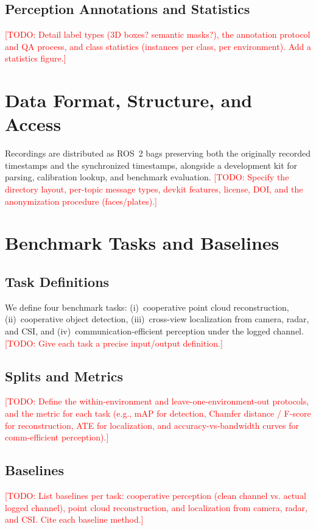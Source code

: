 \documentclass[conference]{IEEEtran}
\newcommand{\todo}[1]{\textcolor{red}{[TODO: #1]}}
\begin{document}
\subsection{Perception Annotations and Statistics}
\todo{Detail label types (3D boxes? semantic masks?), the annotation
protocol and QA process, and class statistics (instances per class, per
environment). Add a statistics figure.}

\section{Data Format, Structure, and Access}
\label{sec:format}
Recordings are distributed as ROS~2 bags preserving both the originally
recorded timestamps and the synchronized timestamps, alongside a
development kit for parsing, calibration lookup, and benchmark evaluation.
\todo{Specify the directory layout, per-topic message types, devkit
features, license, DOI, and the anonymization procedure (faces/plates).}

\section{Benchmark Tasks and Baselines}
\label{sec:benchmarks}

\subsection{Task Definitions}
We define four benchmark tasks: (i)~cooperative point cloud
reconstruction, (ii)~cooperative object detection, (iii)~cross-view
localization from camera, radar, and CSI, and (iv)~communication-efficient
perception under the logged channel.
\todo{Give each task a precise input/output definition.}

\subsection{Splits and Metrics}
\todo{Define the within-environment and leave-one-environment-out
protocols, and the metric for each task (e.g., mAP for detection, Chamfer
distance / F-score for reconstruction, ATE for localization, and
accuracy-vs-bandwidth curves for comm-efficient perception).}

\subsection{Baselines}
\todo{List baselines per task: cooperative perception (clean channel vs.
actual logged channel), point cloud reconstruction, and localization from
camera, radar, and CSI. Cite each baseline method.}
\end{document}
